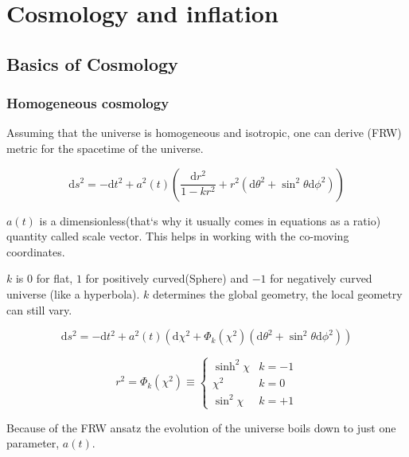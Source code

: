 \chapter{Cosmology and inflation}

\section{Basics of Cosmology}


\subsection{Homogeneous cosmology}

Assuming that the universe is homogeneous and isotropic, one can derive  (FRW)
metric for the spacetime of the universe.


\begin{equation}
\mathrm{d} s^{2}=-\mathrm{d} t^{2}+a^{2}(t)\left(\frac{\mathrm{d} r^{2}}{1-k r^{2}}+r^{2}\left(\mathrm{d} \theta^{2}+\sin ^{2} \theta \mathrm{d} \phi^{2}\right)\right)
\end{equation}




$a(t)$ is a dimensionless(that`s why it usually comes in equations as a ratio) quantity called scale vector. This helps in working with the co-moving coordinates.

$k$ is $0$ for flat, $1$ for positively curved(Sphere) and $-1$ for negatively curved universe (like a hyperbola). $k$ determines the global geometry, the local geometry can still vary.

\begin{equation}
\mathrm{d} s^{2}=-\mathrm{d} t^{2}+a^{2}(t)\left(\mathrm{d} \chi^{2}+\Phi_{k}\left(\chi^{2}\right)\left(\mathrm{d} \theta^{2}+\sin ^{2} \theta \mathrm{d} \phi^{2}\right)\right)
\end{equation}

\begin{equation}
r^{2}=\Phi_{k}\left(\chi^{2}\right) \equiv\left\{\begin{array}{cc}{\sinh ^{2} \chi} & {k=-1} \\ {\chi^{2}} & {k=0} \\ {\sin ^{2} \chi} & {k=+1}\end{array}\right.
\end{equation}



Because of the FRW ansatz the evolution of the universe boils down to just one parameter, $a(t)$.

